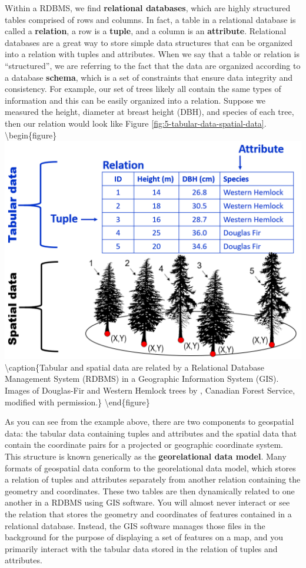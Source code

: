 \documentclass[
]{book}
\begin{document}
Within a RDBMS, we find \textbf{relational databases}, which are highly structured tables comprised of rows and columns. In fact, a table in a relational database is called a \textbf{relation}, a row is a \textbf{tuple}, and a column is an \textbf{attribute}. Relational databases are a great way to store simple data structures that can be organized into a relation with tuples and attributes. When we say that a table or relation is ``structured'', we are referring to the fact that the data are organized according to a database \textbf{schema}, which is a set of constraints that ensure data integrity and consistency. For example, our set of trees likely all contain the same types of information and this can be easily organized into a relation. Suppose we measured the height, diameter at breast height (DBH), and species of each tree, then our relation would look like Figure \ref{fig:5-tabular-data-spatial-data}.
\textbackslash begin\{figure\}
\includegraphics[width=0.75\linewidth]{images/05-tabular-data-spatial-data} \textbackslash caption\{Tabular and spatial data are related by a Relational Database Management System (RDBMS) in a Geographic Information System (GIS). Images of Douglas-Fir and Western Hemlock trees by \citet{canadian_forest_service_douglas-fir_2013}, Canadian Forest Service, modified with permission.\}\label{fig:5-tabular-data-spatial-data}
\textbackslash end\{figure\}

As you can see from the example above, there are two components to geospatial data: the tabular data containing tuples and attributes and the spatial data that contain the coordinate pairs for a projected or geographic coordinate system. This structure is known generically as the \textbf{georelational data model}. Many formats of geospatial data conform to the georelational data model, which stores a relation of tuples and attributes separately from another relation containing the geometry and coordinates. These two tables are then dynamically related to one another in a RDBMS using GIS software. You will almost never interact or see the relation that stores the geometry and coordinates of features contained in a relational database. Instead, the GIS software manages those files in the background for the purpose of displaying a set of features on a map, and you primarily interact with the tabular data stored in the relation of tuples and attributes.
\end{document}

